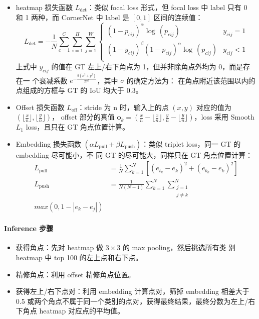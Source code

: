 \begin{itemize}
  \item heatmap 损失函数 $L_{\det}$：类似 focal loss 形式，但 focal loss
    中 label 只有 0 和 1 两种，而 CornerNet 中 label 是 $[0, 1]$ 区间的连续值：
    \begin{equation}
      \label{equ:cornernet-det-loss}
      L_{\det} = -\frac{1}{N} \sum_{c=1}^{C} \sum_{i=1}^{H} \sum_{j=1}^{W}
      \left\{
        \begin{array}{lr}
           {(1-p_{cij})}^{\alpha}\log\,(p_{cij}) & y_{cij} = 1 \\
           {(1-y_{cij})}^{\beta} {(1-p_{cij})}^{\alpha} \log\,(p_{cij}) & y_{cij} < 1 \\
        \end{array}
      \right.
    \end{equation}
    上式中 $y_{cij}$ 的值在 GT 左上/右下角点为 1，但并非除角点外均为 0，而是存在一
    个衰减系数 $e^{-\frac{9(x^2+y^2)}{2\sigma^2}}$，其中 $\sigma$ 的确定方法为：
    在角点附近该范围以内的点组成的方框与 GT 的 IoU 均大于 0.3。
  \item Offset 损失函数 $L_{\mathrm{off}}$：stride 为 n 时，输入上的点 $(x, y)$
    对应的值为 $( \lfloor \frac{x}{n} \rfloor, \lfloor \frac{y}{n} \rfloor)$，
    offset 部分的真值 $\mathbf{o}_k = \left( \frac{x}{n} - \lfloor \frac{x}{n}
      \rfloor, \frac{y}{n} - \lfloor \frac{y}{n} \rfloor \right)$，loss 采用
    Smooth $L_1$ loss，且只在 GT 角点位置计算。
  \item Embedding 损失函数 $(\alpha L_{\mathrm{pull}} + \beta
    L_{\mathrm{push}})$：类似 triplet loss，同一 GT 的 embedding 尽可能小，不
    同 GT 的尽可能大，同样只在 GT 角点位置计算：
    \begin{align}
      \label{equ:cornernet-em-loss-pull}
      L_{\mathrm{pull}} & = \frac{1}{N} \sum_{k=1}^{N} \left[ {(e_{t_k} - e_k)}^2 + {(e_{b_k} - e_k)}^2 \right] \\
      \label{equ:cornernet-em-loss-push}
      L_{\mathrm{push}} & = \frac{1}{N(N-1)} \sum_{k=1}^{N} \sum_{\substack{j=1 \\ j \neq k}}^{N} \\max (0, 1-|e_k-e_j|)
    \end{align}
\end{itemize}

\paragraph{Inference 步骤}
\begin{itemize}
  \item 获得角点：先对 heatmap 做 $3 \times 3$ 的 max pooling，然后挑选所有类
    别 heatmap 中 top 100 的左上点和右下点。
  \item 精修角点：利用 offset 精修角点位置。
  \item 获得左上/右下点对：利用 embedding 计算点对，筛掉 embedding 相差大于 0.5
    或两个角点不属于同一个类别的点对，获得最终结果，最终分数为左上/右下角点
    heatmap 对应点的平均值。
\end{itemize}

